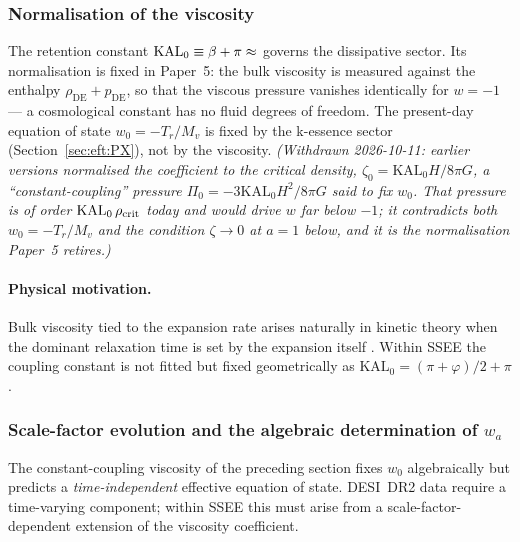 \subsubsection{Normalisation of the viscosity}

The retention constant $\mathrm{KAL}_{0} \equiv \beta + \pi \approx \val{KAL0_d3}$
governs the dissipative sector. Its normalisation is fixed in Paper~5: the bulk
viscosity is measured against the enthalpy $\rho_{\mathrm{DE}}+p_{\mathrm{DE}}$,
so that the viscous pressure vanishes identically for $w=-1$ --- a
cosmological constant has no fluid degrees of freedom. The present-day
equation of state $w_0=-T_r/M_v$ is fixed by the k-essence sector
(Section~\ref{sec:eft:PX}), not by the viscosity.
\emph{(Withdrawn 2026-10-11: earlier versions normalised the coefficient to the
critical density, $\zeta_0=\mathrm{KAL}_0H/8\pi G$, a ``constant-coupling''
pressure $\Pi_0=-3\mathrm{KAL}_0H^2/8\pi G$ said to fix $w_0$. That pressure is
of order $\mathrm{KAL}_0\,\rho_{\rm crit}$ today and would drive $w$ far below
$-1$; it contradicts both $w_0=-T_r/M_v$ and the condition $\zeta\to0$ at $a=1$
below, and it is the normalisation Paper~5 retires.)}

\paragraph{Physical motivation.}
Bulk viscosity tied to the expansion rate arises naturally in kinetic theory
when the dominant relaxation time is set by the expansion itself
\citep{Weinberg1971, Brevik2005}.  Within SSEE the coupling constant is not
fitted but fixed geometrically as $\mathrm{KAL}_{0} = (\pi+\varphi)/2 + \pi$.

\subsubsection{Scale-factor evolution and the algebraic determination of \texorpdfstring{$w_a$}{wa}}
\label{sec:eft:wa_derivation}

The constant-coupling viscosity of the preceding section fixes $w_0$
algebraically but predicts a \emph{time-independent} effective equation of
state.  DESI~DR2 data require a time-varying component; within SSEE this must
arise from a scale-factor-dependent extension of the viscosity coefficient.

